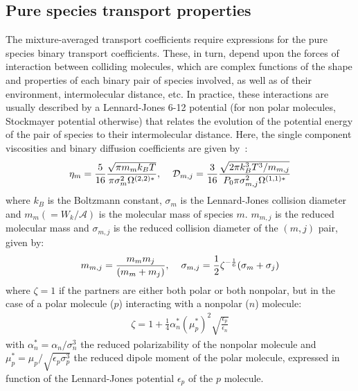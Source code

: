 \subsection{Pure species transport properties}
The mixture-averaged transport coefficients require expressions for the pure species binary transport coefficients.  These, in turn, depend upon the forces of interaction between colliding molecules, which are complex functions of the shape and properties of each binary pair of species involved, as well as of their environment, intermolecular distance, etc. In practice, these interactions are usually described by a Lennard-Jones 6-12 potential (for non polar molecules, Stockmayer potential otherwise) that relates the evolution of the potential energy of the pair of species to their intermolecular distance. Here, the single component viscosities and binary diffusion coefficients are given by~\cite{Hirschfelder:1954}:
\begin{eqnarray}
\eta_m = \frac{5}{16} \frac{\sqrt{\pi m_m k_B T}}{\pi \sigma^2_m \Omega^{(2,2)*}},
\hspace{4mm}
\mathcal{D}_{m,j} = \frac{3}{16}\frac{\sqrt{2 \pi k^3_B T^3/m_{m,j}}}{P_0 \pi \sigma^2_{m,j} \Omega^{(1,1)*}}
\label{binary}
\end{eqnarray}
where $k_B$ is the Boltzmann constant, $\sigma_m$ is the Lennard-Jones collision diameter and $m_m (= W_k/\mathcal{A})$ is the molecular mass of species $m$. $m_{m,j}$ is the reduced molecular mass and $\sigma_{m,j}$ is the reduced collision diameter of the $(m,j)$ pair, given by:
\begin{eqnarray}
m_{m,j} = \frac{m_m m_j }{ (m_m + m_j)},
\hspace{4mm}
\sigma_{m,j} = \frac{1}{2} \zeta^{-\frac{1}{6}}(\sigma_m + \sigma_j)
\label{redCollision}
\end{eqnarray}
where $\zeta=1$ if the partners are either both polar or both nonpolar, but in the case of a polar molecule ($p$) interacting with a nonpolar ($n$) molecule:
\begin{eqnarray*}
\zeta=1 + \frac{1}{4} \alpha^*_n (\mu^*_p)^2 \sqrt{\frac{\epsilon_p}{\epsilon_n}}
\end{eqnarray*}
with $ \alpha^*_n = \alpha_n / \sigma^3_n$ the reduced polarizability of the nonpolar molecule and  $\mu^*_p = \mu_p/\sqrt{\epsilon_p \sigma^3_p}$ the reduced dipole moment of the polar molecule, expressed in function of the Lennard-Jones potential $\epsilon_p$ of the $p$ molecule.

